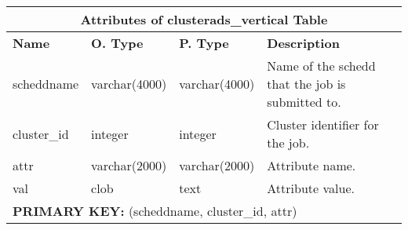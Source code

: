 \begin{center}
\begin{tabular}{|l|l|l|p{3.2in}|}\hline
    \multicolumn{4}{|c|}{\textbf{Attributes of clusterads\_vertical Table}}\\ \hline
    \textbf{Name} & \textbf{O. Type} & \textbf{P. Type} & \textbf{Description}\\ \hline
    scheddname & varchar(4000) & varchar(4000) & Name of the schedd that the job is submitted to.\\ \hline
    cluster\_id & integer & integer & Cluster identifier for the job.\\ \hline
    attr & varchar(2000) & varchar(2000) & Attribute name.\\ \hline
    val & clob & text & Attribute value.\\ \hline
    \multicolumn{4}{|l|}{\textbf{PRIMARY KEY:} (scheddname, cluster\_id, attr)} \\ \hline
  \end{tabular}
\vspace{24pt}


\end{center}
